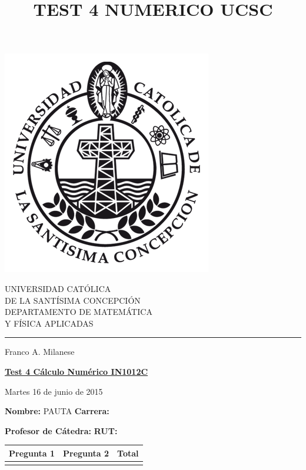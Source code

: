 \documentclass[11pt]{article}
\begin{document}
\title{TEST 4 NUMERICO UCSC}

\begin{minipage}{0.15\textwidth}
\includegraphics[width=\textwidth]{ucsc.png}
\end{minipage}
\begin{minipage}{0.9\textwidth}
{UNIVERSIDAD CAT\'OLICA}\\ 
{DE LA SANT\'ISIMA CONCEPCI\'ON}\\
{DEPARTAMENTO DE MATEM\'ATICA}\\ 
{ Y F\'ISICA APLICADAS}\\
\rule{0.66\textwidth}{.5pt} Franco A. Milanese
\end{minipage}

\vspace*{0.5cm} \centerline {\bf\underline{Test 4 C\'alculo Num\'erico IN1012C }}
\centerline{\textrm{Martes 16 de junio de 2015}}  

\vspace{0.2cm}
\textbf{Nombre:} PAUTA \hspace{0.65\textwidth}\textbf{Carrera:}

\vspace{0.1cm}
\textbf{Profesor de C\'atedra:}\hspace{0.5\textwidth} \textbf{ RUT:}
 \begin{center}
 \begin{tabular}{||p{2cm}|p{2cm}|p{2cm}||}
 \hline
 Pregunta 1 &  Pregunta 2 &     Total\\
 \hline

  \vspace{1.3cm} & &       \\
 \hline
 \end{tabular}
 \end{center}
\end{document}
